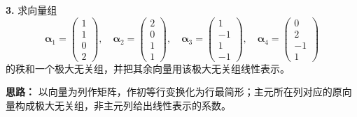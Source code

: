 \textbf{3.} 求向量组
\[
\boldsymbol{\alpha}_1=\begin{pmatrix}1\\1\\0\\2\end{pmatrix},\quad
\boldsymbol{\alpha}_2=\begin{pmatrix}2\\0\\1\\1\end{pmatrix},\quad
\boldsymbol{\alpha}_3=\begin{pmatrix}1\\-1\\1\\-1\end{pmatrix},\quad
\boldsymbol{\alpha}_4=\begin{pmatrix}0\\2\\-1\\1\end{pmatrix}
\]
的秩和一个极大无关组，并把其余向量用该极大无关组线性表示。

\ifshowsolutions%
\textbf{思路：} 以向量为列作矩阵，作初等行变换化为行最简形；主元所在列对应的原向量构成极大无关组，非主元列给出线性表示的系数。

